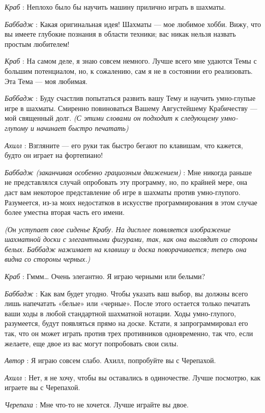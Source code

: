 \emph{Краб} : Неплохо было бы научить машину прилично играть в шахматы.

\emph{Баббадж} : Какая оригинальная идея! Шахматы --- мое любимое хобби. Вижу, что вы имеете глубокие познания в области техники; вас никак нельзя назвать простым любителем!

\emph{Краб} : На самом деле, я знаю совсем немного. Лучше всего мне удаются Темы с большим потенциалом, но, к сожалению, сам я не в состоянии его реализовать. Эта Тема --- моя любимая.

\emph{Баббадж} : Буду счастлив попытаться развить вашу Тему и научить умно-глупые игре в шахматы. Смиренно повиноваться Вашему Августейшему Крабичеству --- мой священный долг. \emph{(С этими словами он подходит к следующему умно-глупому и начинает быстро печатать)}

\emph{Ахилл} : Взгляните --- его руки так быстро бегают по клавишам, что кажется, будто он играет на фортепиано!

\emph{Баббадж (заканчивая особенно грациозным движением)} : Мне никогда раньше не представлялся случай опробовать эту программу, но, по крайней мере, она даст вам некоторое представление об игре в шахматы против умно-глупого. Разумеется, из-за моих недостатков в искусстве программирования в этом случае более уместна вторая часть его имени.

\emph{(Он уступает свое сиденье Крабу. На дисплее появляется изображение шахматной доски с элегантными фигурами, так, как она выглядит со стороны белых. Баббадж нажимает на клавишу и доска поворачивается; теперь она видна со стороны черных.)}

\emph{Краб} : Гммм\ldots{} Очень элегантно. Я играю черными или белыми?

\emph{Баббадж} : Как вам будет угодно. Чтобы указать ваш выбор, вы должны всего лишь напечатать «белые» или «черные». После этого остается только печатать ваши ходы в любой стандартной шахматной нотации. Ходы умно-глупого, разумеется, будут появляться прямо на доске. Кстати, я запрограммировал его так, что он может играть против трех противников одновременно, так что, если желаете, еще двое из вас могут попробовать свои силы.

\emph{Автор} : Я играю совсем слабо. Ахилл, попробуйте вы с Черепахой.

\emph{Ахилл} : Нет, я не хочу, чтобы вы оставались в одиночестве. Лучше посмотрю, как играете вы с Черепахой.

\emph{Черепаха} : Мне что-то не хочется. Лучше играйте вы двое.

